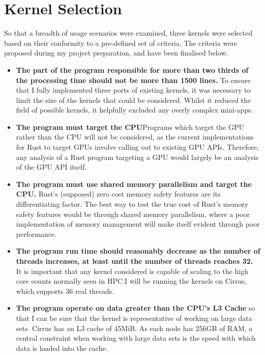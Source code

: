 \section{Kernel Selection}
So that a breadth of usage scenarios were examined, three kernels were selected based on their conformity to a pre-defined set of criteria. The criteria were proposed during my project preparation, and have been finalised below.
\begin{itemize}
  \item \textbf{The part of the program responsible for more than two thirds of the processing time should not be more than 1500 lines.} To ensure that I fully implemented three ports of existing kernels, it was necessary to limit the size of the kernels that could be considered. Whilst it reduced the field of possible kernels, it helpfully excluded any overly complex mini-apps.

  \item \textbf{The program must target the CPU}Programs which target the GPU rather than the CPU will not be considered, as the current implementations for Rust to target GPUs involve calling out to existing GPU APIs. Therefore, any analysis of a Rust program targeting a GPU would largely be an analysis of the GPU API itself.

  \item \textbf{The program must use shared memory parallelism and target the CPU.} Rust's (supposed) zero cost memory safety features are its differentiating factor. The best way to test the true cost of Rust's memory safety features would be through shared memory parallelism, where a poor implementation of memory management will make itself evident through poor performance.
  
  \item \textbf{The program run time should reasonably decrease as the number of threads increases, at least until the number of threads reaches 32.} It is important that any kernel considered is capable of scaling to the high core counts normally seen in HPC.I will be running the kernels on Cirrus, which supports 36 real threads.

  \item \textbf{The program operate on data greater than the CPU's L3 Cache} so that I can be sure that the kernel is representative of working on large data sets. Cirrus has an L3 cache of 45MiB. As each node has 256GB of RAM, a central constraint when working with large data sets is the speed with which data is loaded into the cache. 


\end{itemize}
